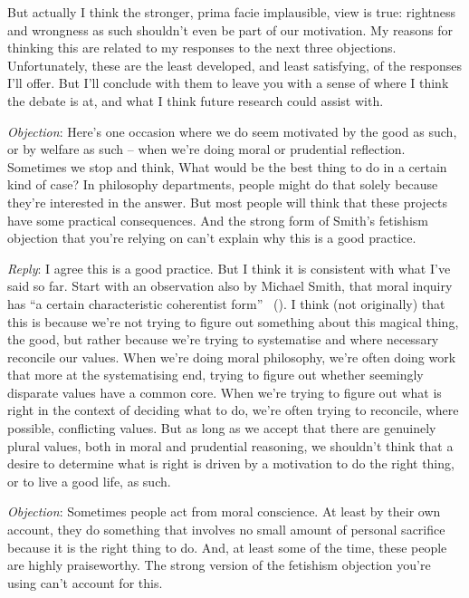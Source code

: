 \documentclass[
  11pt,
  letterpaper,
  DIV=11,
  numbers=noendperiod,
  twoside]{scrartcl}
\begin{document}
But actually I think the stronger, prima facie implausible, view is
true: rightness and wrongness as such shouldn't even be part of our
motivation. My reasons for thinking this are related to my responses to
the next three objections. Unfortunately, these are the least developed,
and least satisfying, of the responses I'll offer. But I'll conclude
with them to leave you with a sense of where I think the debate is at,
and what I think future research could assist with.

\emph{Objection}: Here's one occasion where we do seem motivated by the
good as such, or by welfare as such -- when we're doing moral or
prudential reflection. Sometimes we stop and think, What would be the
best thing to do in a certain kind of case? In philosophy departments,
people might do that solely because they're interested in the answer.
But most people will think that these projects have some practical
consequences. And the strong form of Smith's fetishism objection that
you're relying on can't explain why this is a good practice.

\emph{Reply}: I agree this is a good practice. But I think it is
consistent with what I've said so far. Start with an observation also by
Michael Smith, that moral inquiry has ``a certain characteristic
coherentist form'' ~(). I
think (not originally) that this is because we're not trying to figure
out something about this magical thing, the good, but rather because
we're trying to systematise and where necessary reconcile our values.
When we're doing moral philosophy, we're often doing work that more at
the systematising end, trying to figure out whether seemingly disparate
values have a common core. When we're trying to figure out what is right
in the context of deciding what to do, we're often trying to reconcile,
where possible, conflicting values. But as long as we accept that there
are genuinely plural values, both in moral and prudential reasoning, we
shouldn't think that a desire to determine what is right is driven by a
motivation to do the right thing, or to live a good life, as such.

\emph{Objection}: Sometimes people act from moral conscience. At least
by their own account, they do something that involves no small amount of
personal sacrifice because it is the right thing to do. And, at least
some of the time, these people are highly praiseworthy. The strong
version of the fetishism objection you're using can't account for this.
\end{document}
